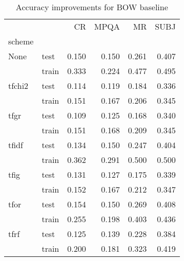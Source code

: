 \begin{table}[H]
\begin{center}

\begin{tabular}{llrrrr}
\toprule
{} &      &  CR &  MPQA &  MR &  SUBJ \\
scheme &  &            &              &            &              \\
\midrule
None & test &      0.150 &        0.150 &      0.261 &        0.407 \\
{} & train &      0.333 &        0.224 &      0.477 &        0.495 \\
tfchi2 & test &      0.114 &        0.119 &      0.184 &        0.336 \\
{} & train &      0.151 &        0.167 &      0.206 &        0.345 \\
tfgr & test &      0.109 &        0.125 &      0.168 &        0.340 \\
{} & train &      0.151 &        0.168 &      0.209 &        0.345 \\
tfidf & test &      0.134 &        0.150 &      0.247 &        0.404 \\
{} & train &      0.362 &        0.291 &      0.500 &        0.500 \\
tfig & test &      0.131 &        0.127 &      0.175 &        0.339 \\
{} & train &      0.152 &        0.167 &      0.212 &        0.347 \\
tfor & test &      0.154 &        0.150 &      0.269 &        0.408 \\
{} & train &      0.255 &        0.198 &      0.403 &        0.436 \\
tfrf & test &      0.125 &        0.139 &      0.228 &        0.384 \\
{} & train &      0.200 &        0.181 &      0.323 &        0.419 \\
\bottomrule
\end{tabular}

\caption[Accuracy improvements for BOW baseline]{Accuracy improvements for BOW baseline}
\label{}
\end{center}
\end{table}



